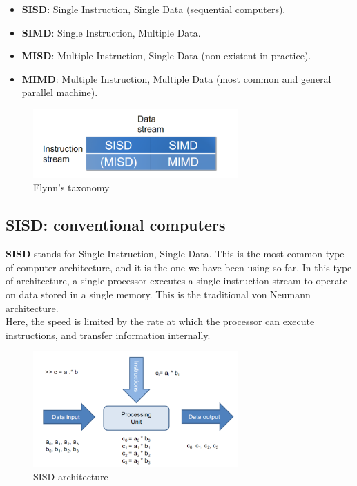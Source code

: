\begin{itemize}
    \item \textbf{SISD}: Single Instruction, Single Data (sequential computers).
    \item \textbf{SIMD}: Single Instruction, Multiple Data.
    \item \textbf{MISD}: Multiple Instruction, Single Data (non-existent in practice).
    \item \textbf{MIMD}: Multiple Instruction, Multiple Data (most common and general parallel machine).
\end{itemize}

\begin{figure}[H]
    \centering
    \includegraphics[width=0.7\textwidth]{figures/Flynn_tax.png}
    \caption{Flynn's taxonomy}
    \label{fig:flynn_tax}
\end{figure}

\subsection{SISD: conventional computers}

\textbf{SISD} stands for Single Instruction, Single Data. This is the most common type of
computer architecture, and it is the one we have been using so far. In this type of
architecture, a single processor executes a single instruction stream to operate on data
stored in a single memory. This is the traditional von Neumann architecture.\\

Here, the speed is limited by the rate at which the processor can execute instructions, and
transfer information internally.

\begin{figure}[H]
    \centering
    \includegraphics[width=0.7\textwidth]{figures/sisd.png}
    \caption{SISD architecture}
    \label{fig:sisd}
\end{figure}

